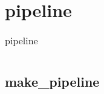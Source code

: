 \chapter{pipeline\label{pipeline}}
\begin{table}
    \centering
    \caption{pipeline}
    \begin{tabular}{l}
        \hline
        \nameref{makepipeline} \\
        \hline
    \end{tabular}
\end{table}
\section{make\_pipeline\label{makepipeline}}
